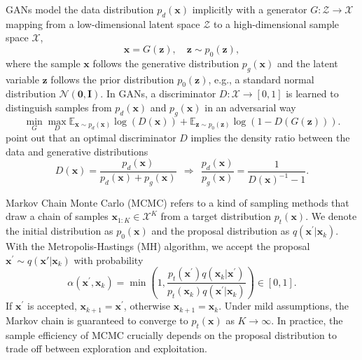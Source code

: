 \documentclass[runningheads]{llncs}
\newcommand{\bx}{\mathbf{x}}
\newcommand{\bz}{\mathbf{z}}
\newcommand{\bI}{\mathbf{I}}
\newcommand{\cN}{\mathcal{N}}
\newcommand{\cX}{\mathcal{X}}
\newcommand{\cZ}{\mathcal{Z}}
\newcommand{\bbE}{\mathbb{E}}
\newcommand{\bbR}{\mathbb{R}}
\newcommand{\bzero}{\mathbf{0}}
\newcommand{\<}{\left\langle}
\renewcommand{\>}{\right\rangle}
\begin{document}
GANs model the data distribution $p_d(\bx)$ implicitly with a generator $G: \cZ\to\cX$ mapping from a low-dimensional latent space $\cZ$ to a high-dimensional sample space $\cX$,
\begin{equation}
    \bx=G(\bz), \quad \bz\sim p_0(\bz),
\end{equation}
where the sample $\bx$ follows the generative distribution $p_g(\bx)$ and the latent variable $\bz$ follows the prior distribution $p_0(\bz)$, e.g., a standard normal distribution $\cN(\bzero,\bI)$. In GANs, a discriminator  $D:\cX\to[0,1]$ is learned to distinguish samples from $p_d(\bx)$ and $p_g(\bx)$ in an adversarial way
\begin{equation}
    \min_G\max_D\bbE_{\bx\sim p_d(\bx)}\log(D(\bx))+\bbE_{\bz\sim p_0(\bz)}\log(1-D(G(\bz))).
\end{equation}
\cite{goodfellow2014generative} point out that an optimal discriminator $D$ implies the density ratio between the data and generative distributions 
\begin{equation}
D(\mathbf{x})=\frac{p_{d}(\mathbf{x})}{p_{d}(\mathbf{x})+p_{g}(\mathbf{x})} ~~\Rightarrow ~~ \frac{p_d(\bx)}{p_g(\bx)}=\frac{1}{D(\bx)^{-1}-1}.
\label{eq:optimal-D}
\end{equation}

Markov Chain Monte Carlo (MCMC) refers to a kind of sampling methods that draw a chain of samples $\bx_{1:K}\in\cX^K$ from a target distribution $p_t(\bx)$. We denote the initial distribution as $p_0(\bx)$ and the proposal distribution as $q(\bx^\prime|\bx_k)$. With the Metropolis-Hastings (MH) algorithm, we accept the proposal $\bx^\prime\sim q(\bx'|\bx_k)$ with probability
\begin{equation}
\alpha\left(\mathbf{x}^{\prime}, \mathbf{x}_{k}\right)=\min \left(1, \frac{p_t\left(\mathbf{x}^{\prime}\right) q\left(\mathbf{x}_{k}|\bx^\prime\right)}{p_t\left(\mathbf{x}_{k}\right) q\left(\mathbf{x}^{\prime}|\bx_k\right)}\right) \in[0,1].   
\label{eq:mh-accept} 
\end{equation}
If $\bx^{\prime}$ is accepted, $\bx_{k+1}=\bx^{\prime}$, otherwise $\bx_{k+1}=\bx_{k}$. Under mild assumptions, the Markov chain is guaranteed to converge to $p_t(\bx)$ as $K\to\infty$. In practice, the sample efficiency of MCMC crucially depends on the proposal distribution to trade off between exploration and exploitation. 
\end{document}
